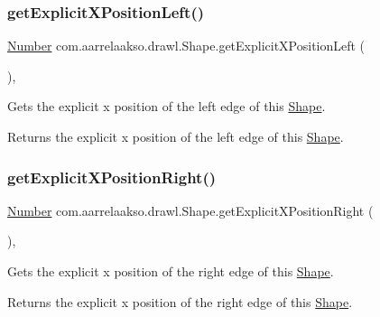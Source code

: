 \subsubsection{\texorpdfstring{get\+Explicit\+X\+Position\+Left()}{getExplicitXPositionLeft()}}
{\footnotesize\ttfamily \hyperlink{interfacecom_1_1aarrelaakso_1_1drawl_1_1_number}{Number} com.\+aarrelaakso.\+drawl.\+Shape.\+get\+Explicit\+X\+Position\+Left (\begin{DoxyParamCaption}{ }\end{DoxyParamCaption})\hspace{0.3cm}{\ttfamily [protected]}, {\ttfamily [inherited]}}



Gets the explicit x position of the left edge of this \hyperlink{classcom_1_1aarrelaakso_1_1drawl_1_1_shape}{Shape}. 

\begin{DoxyReturn}{Returns}
the explicit x position of the left edge of this \hyperlink{classcom_1_1aarrelaakso_1_1drawl_1_1_shape}{Shape}. 
\end{DoxyReturn}
\mbox{\label{classcom_1_1aarrelaakso_1_1drawl_1_1_shape_a86920ba43a76d5a02977e5f9ea3509ac}} 
\subsubsection{\texorpdfstring{get\+Explicit\+X\+Position\+Right()}{getExplicitXPositionRight()}}
{\footnotesize\ttfamily \hyperlink{interfacecom_1_1aarrelaakso_1_1drawl_1_1_number}{Number} com.\+aarrelaakso.\+drawl.\+Shape.\+get\+Explicit\+X\+Position\+Right (\begin{DoxyParamCaption}{ }\end{DoxyParamCaption})\hspace{0.3cm}{\ttfamily [protected]}, {\ttfamily [inherited]}}



Gets the explicit x position of the right edge of this \hyperlink{classcom_1_1aarrelaakso_1_1drawl_1_1_shape}{Shape}. 

\begin{DoxyReturn}{Returns}
the explicit x position of the right edge of this \hyperlink{classcom_1_1aarrelaakso_1_1drawl_1_1_shape}{Shape}. 
\end{DoxyReturn}
\mbox{\label{classcom_1_1aarrelaakso_1_1drawl_1_1_shape_a28b8e03381be6afdc7c5c8da48c80afe}} 

